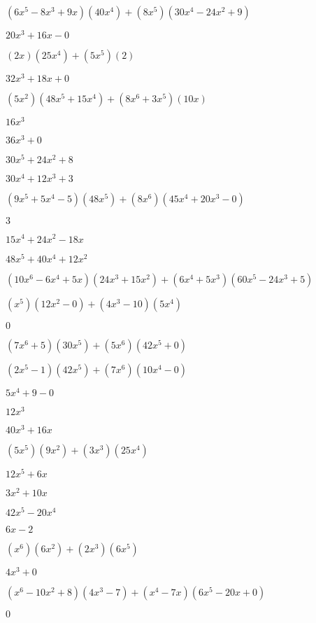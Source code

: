 \documentclass{article}
\begin{document}
\begin{multicols}{2}
$(6x^{5}-8x^{3}+9x)(40x^{4})+(8x^{5})(30x^{4}-24x^{2}+9)$\item $20x^{3}+16x-0$\item $(2x)(25x^{4})+(5x^{5})(2)$\item $32x^{3}+18x+0$\item $(5x^2)(48x^{5}+15x^{4})+(8x^{6}+3x^{5})(10x)$\item $16x^{3}$\item $36x^{3}+0$\item $30x^{5}+24x^{2}+8$\item $30x^{4}+12x^{3}+3$\item $(9x^{5}+5x^{4}-5)(48x^{5})+(8x^{6})(45x^{4}+20x^{3}-0)$\item $3$\item $15x^{4}+24x^{2}-18x$\item $48x^{5}+40x^{4}+12x^{2}$\item $(10x^{6}-6x^{4}+5x)(24x^{3}+15x^{2})+(6x^{4}+5x^{3})(60x^{5}-24x^{3}+5)$\item $(x^{5})(12x^{2}-0)+(4x^{3}-10)(5x^{4})$\item $0$\item $(7x^{6}+5)(30x^{5})+(5x^{6})(42x^{5}+0)$\item $(2x^{5}-1)(42x^{5})+(7x^{6})(10x^{4}-0)$\item $5x^{4}+9-0$\item $12x^{3}$\item $40x^{3}+16x$\item $(5x^{5})(9x^{2})+(3x^{3})(25x^{4})$\item $12x^{5}+6x$\item $3x^{2}+10x$\item $42x^{5}-20x^{4}$\item $6x-2$\item $(x^{6})(6x^{2})+(2x^{3})(6x^{5})$\item $4x^{3}+0$\item $(x^{6}-10x^2+8)(4x^{3}-7)+(x^{4}-7x)(6x^{5}-20x+0)$\item $0$\item 
\end{multicols}
\end{document}
